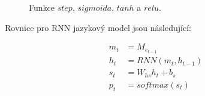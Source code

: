 \begin{figure}[H]
    \begin{center}
    \end{center}
	\caption{Funkce $step$, $sigmoida$, $tanh$ a $relu$.}
	\label{img:functions}
\end{figure}

Rovnice pro RNN jazykový model jsou následující:

\begin{align}
  m_{t}&=M_{e_{t-1}}\label{figure:lastContext} \\
  h_{t}&=RNN(m_t, h_{t-1}) \label{figure:rnnSimple} \\
  s_{t}&=W_{hs}h_t + b_s \label{figure:rnnSt} \\
  p_{t}&=softmax(s_t) \label{figure:rnnSoftmax}
\end{align}


